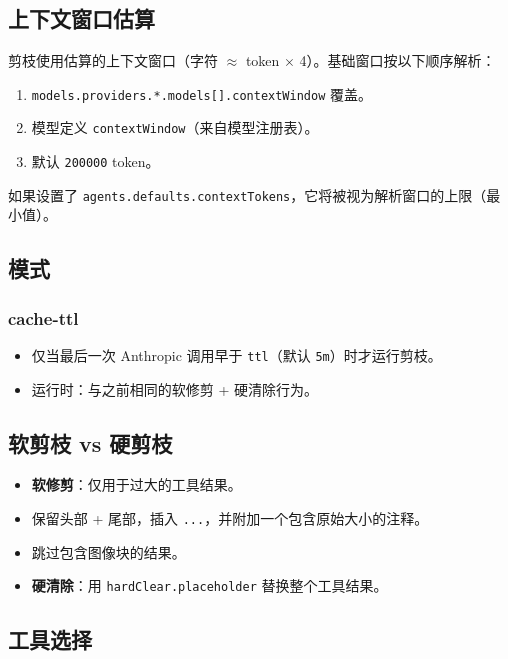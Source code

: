 \subsection{上下文窗口估算}


剪枝使用估算的上下文窗口（字符 $\approx$ token $\times$ 4）。基础窗口按以下顺序解析：

\begin{enumerate}
  \item \texttt{models.providers.*.models[].contextWindow} 覆盖。
  \item 模型定义 \texttt{contextWindow}（来自模型注册表）。
  \item 默认 \texttt{200000} token。
\end{enumerate}


如果设置了 \texttt{agents.defaults.contextTokens}，它将被视为解析窗口的上限（最小值）。

\subsection{模式}


\subsubsection{cache-ttl}


\begin{itemize}
  \item 仅当最后一次 Anthropic 调用早于 \texttt{ttl}（默认 \texttt{5m}）时才运行剪枝。
  \item 运行时：与之前相同的软修剪 + 硬清除行为。
\end{itemize}


\subsection{软剪枝 vs 硬剪枝}


\begin{itemize}
  \item \textbf{软修剪}：仅用于过大的工具结果。
  \item 保留头部 + 尾部，插入 \texttt{...}，并附加一个包含原始大小的注释。
  \item 跳过包含图像块的结果。
  \item \textbf{硬清除}：用 \texttt{hardClear.placeholder} 替换整个工具结果。
\end{itemize}


\subsection{工具选择}



